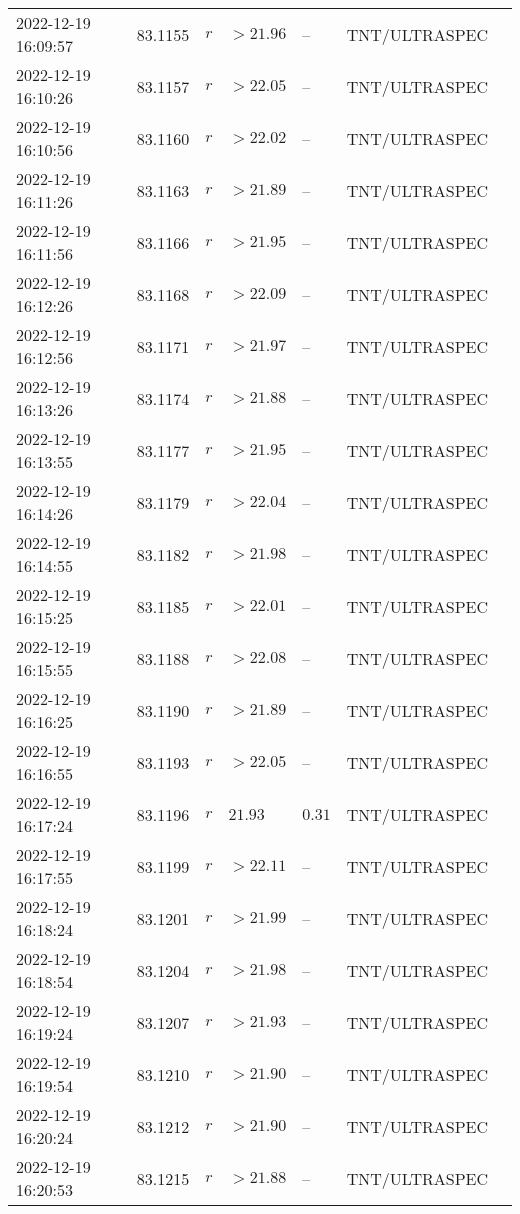 \documentclass{nature_plusfigure}
\begin{document}
\begin{supplement}
\begin{center}
\begin{longtable}{lllllll}
2022-12-19 16:09:57 & 83.1155 & $r$ & $>21.96$ & -- & TNT/ULTRASPEC &  \\ 
2022-12-19 16:10:26 & 83.1157 & $r$ & $>22.05$ & -- & TNT/ULTRASPEC &  \\ 
2022-12-19 16:10:56 & 83.1160 & $r$ & $>22.02$ & -- & TNT/ULTRASPEC &  \\ 
2022-12-19 16:11:26 & 83.1163 & $r$ & $>21.89$ & -- & TNT/ULTRASPEC &  \\ 
2022-12-19 16:11:56 & 83.1166 & $r$ & $>21.95$ & -- & TNT/ULTRASPEC &  \\ 
2022-12-19 16:12:26 & 83.1168 & $r$ & $>22.09$ & -- & TNT/ULTRASPEC &  \\ 
2022-12-19 16:12:56 & 83.1171 & $r$ & $>21.97$ & -- & TNT/ULTRASPEC &  \\ 
2022-12-19 16:13:26 & 83.1174 & $r$ & $>21.88$ & -- & TNT/ULTRASPEC &  \\ 
2022-12-19 16:13:55 & 83.1177 & $r$ & $>21.95$ & -- & TNT/ULTRASPEC &  \\ 
2022-12-19 16:14:26 & 83.1179 & $r$ & $>22.04$ & -- & TNT/ULTRASPEC &  \\ 
2022-12-19 16:14:55 & 83.1182 & $r$ & $>21.98$ & -- & TNT/ULTRASPEC &  \\ 
2022-12-19 16:15:25 & 83.1185 & $r$ & $>22.01$ & -- & TNT/ULTRASPEC &  \\ 
2022-12-19 16:15:55 & 83.1188 & $r$ & $>22.08$ & -- & TNT/ULTRASPEC &  \\ 
2022-12-19 16:16:25 & 83.1190 & $r$ & $>21.89$ & -- & TNT/ULTRASPEC &  \\ 
2022-12-19 16:16:55 & 83.1193 & $r$ & $>22.05$ & -- & TNT/ULTRASPEC &  \\ 
2022-12-19 16:17:24 & 83.1196 & $r$ & $21.93$ & $0.31$ & TNT/ULTRASPEC &  \\ 
2022-12-19 16:17:55 & 83.1199 & $r$ & $>22.11$ & -- & TNT/ULTRASPEC &  \\ 
2022-12-19 16:18:24 & 83.1201 & $r$ & $>21.99$ & -- & TNT/ULTRASPEC &  \\ 
2022-12-19 16:18:54 & 83.1204 & $r$ & $>21.98$ & -- & TNT/ULTRASPEC &  \\ 
2022-12-19 16:19:24 & 83.1207 & $r$ & $>21.93$ & -- & TNT/ULTRASPEC &  \\ 
2022-12-19 16:19:54 & 83.1210 & $r$ & $>21.90$ & -- & TNT/ULTRASPEC &  \\ 
2022-12-19 16:20:24 & 83.1212 & $r$ & $>21.90$ & -- & TNT/ULTRASPEC &  \\ 
2022-12-19 16:20:53 & 83.1215 & $r$ & $>21.88$ & -- & TNT/ULTRASPEC &  \\ 

\end{longtable}
\end{center}
\end{supplement}
\end{document}
